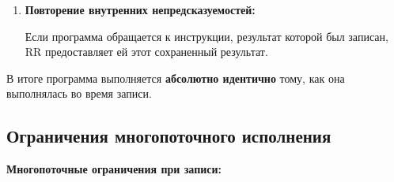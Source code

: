 \begin{itemize}
\begin{enumerate}
\begin{itemize}
      \end{itemize}

    \item \textbf{Повторение внутренних непредсказуемостей:}

      Если программа обращается к инструкции, результат которой был записан, RR предоставляет ей этот сохраненный результат.

    \end{enumerate}

    В итоге программа выполняется \textbf{абсолютно идентично} тому, как она
    выполнялась во время записи.

\end{itemize}

\subsection{Ограничения многопоточного исполнения}




\textbf{Многопоточные ограничения при записи:}

